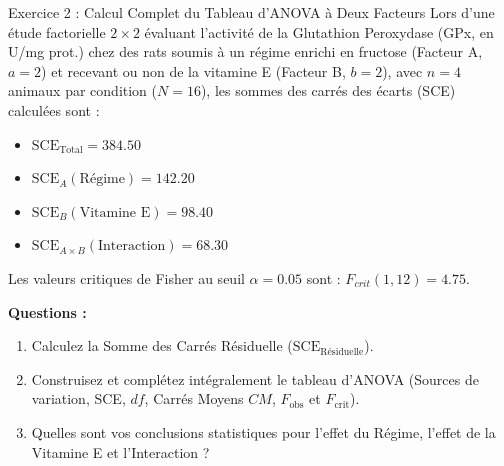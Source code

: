 \documentclass[11pt,a4paper]{article}
\begin{document}
\begin{exercicebox}{Exercice 2 : Calcul Complet du Tableau d'ANOVA à Deux Facteurs}
Lors d'une étude factorielle $2 \times 2$ évaluant l'activité de la Glutathion Peroxydase (GPx, en U/mg prot.) chez des rats soumis à un régime enrichi en fructose (Facteur A, $a=2$) et recevant ou non de la vitamine E (Facteur B, $b=2$), avec $n = 4$ animaux par condition ($N = 16$), les sommes des carrés des écarts (SCE) calculées sont :
\begin{itemize}
  \item $\text{SCE}_{\text{Total}} = 384.50$
  \item $\text{SCE}_A (\text{Régime}) = 142.20$
  \item $\text{SCE}_B (\text{Vitamine E}) = 98.40$
  \item $\text{SCE}_{A \times B} (\text{Interaction}) = 68.30$
\end{itemize}
Les valeurs critiques de Fisher au seuil $\alpha = 0.05$ sont : $F_{crit}(1, 12) = 4.75$.

\textbf{Questions :}
\begin{enumerate}[label=\textbf{\alph*.}]
  \item Calculez la Somme des Carrés Résiduelle ($\text{SCE}_{\text{Résiduelle}}$).
  \item Construisez et complétez intégralement le tableau d'ANOVA (Sources de variation, SCE, $df$, Carrés Moyens $CM$, $F_{\text{obs}}$ et $F_{\text{crit}}$).
  \item Quelles sont vos conclusions statistiques pour l'effet du Régime, l'effet de la Vitamine E et l'Interaction ?
\end{enumerate}
\end{exercicebox}
\end{document}
